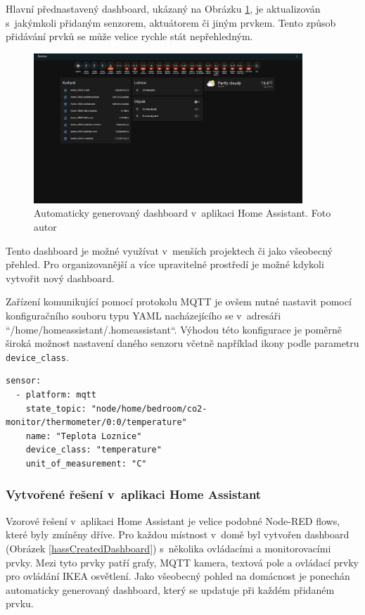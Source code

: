 Hlavní přednastavený dashboard, ukázaný na Obrázku \ref{hassDefaultDashboard}, je aktualizován s~jakýmkoli přidaným senzorem, aktuátorem či jiným prvkem. Tento způsob přidávání prvků se může velice rychle stát nepřehledným. 

\begin{figure}[H]
  \centering
  \includegraphics[width=0.9\textwidth]{obrazky-figures/dashboards/homeAssistantDefaultDashboard.PNG}
  \caption{Automaticky generovaný dashboard v~aplikaci Home Assistant. Foto autor}
  \label{hassDefaultDashboard}
\end{figure}

Tento dashboard je možné využívat v~menších projektech či jako všeobecný přehled. Pro organizovanější a více upravitelné prostředí je možné kdykoli vytvořit nový dashboard.

Zařízení komunikující pomocí protokolu MQTT je ovšem nutné nastavit pomocí konfiguračního souboru typu YAML nacházejícího se v~adresáři ``/home/homeassistant/.homeassistant``. Výhodou této konfigurace je poměrně široká možnost nastavení daného senzoru včetně například ikony podle parametru \verb|device_class|.

\begin{lstlisting}[caption=Ukázka konfigurace MQTT senzoru pro měření teploty]
sensor:
  - platform: mqtt
    state_topic: "node/home/bedroom/co2-monitor/thermometer/0:0/temperature"
    name: "Teplota Loznice"
    device_class: "temperature"
    unit_of_measurement: "C"
\end{lstlisting}

\subsubsection*{Vytvořené řešení v~aplikaci Home Assistant}
Vzorové řešení v~aplikaci Home Assistant je velice podobné Node-RED flows, 
které byly zmíněny dříve. 
Pro každou místnost v~domě byl vytvořen dashboard (Obrázek \ref{hassCreatedDashboard}) s~několika ovládacími a monitorovacími prvky. Mezi tyto prvky patří grafy, MQTT kamera, textová pole a ovládací prvky pro ovládání IKEA osvětlení.
Jako všeobecný pohled na domácnost je ponechán automaticky generovaný dashboard, který se updatuje při každém přidaném prvku.

